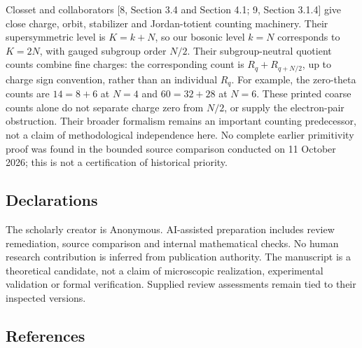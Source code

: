 \documentclass[
  11pt,
]{article}
\begin{document}
Closset and collaborators {[}8, Section 3.4 and Section 4.1; 9,
Section 3.1.4{]} give close charge, orbit, stabilizer and Jordan-totient
counting machinery. Their supersymmetric level is \(K=k+N\), so our
bosonic level \(k=N\) corresponds to \(K=2N\), with gauged subgroup
order \(N/2\). Their subgroup-neutral quotient counts combine fine
charges: the corresponding count is \(R_q+R_{q+N/2}\), up to charge
sign convention, rather than an individual \(R_q\). For example, the
zero-theta counts are \(14=8+6\) at \(N=4\) and \(60=32+28\) at
\(N=6\). These printed coarse counts alone do not separate charge zero
from \(N/2\), or supply the electron-pair obstruction. Their broader
formalism remains an important counting predecessor, not a claim of
methodological independence here. No complete earlier primitivity proof
was found in the bounded source comparison conducted on 11 October 2026;
this is not a certification of historical priority.

\subsection{Declarations}\label{declarations}

The scholarly creator is Anonymous. AI-assisted preparation includes
review remediation, source comparison and internal mathematical checks.
No human research contribution is inferred from publication authority.
The manuscript is a theoretical candidate, not a claim of microscopic
realization, experimental validation or formal verification. Supplied
review assessments remain tied to their inspected versions.

\subsection{References}\label{references}
\end{document}
